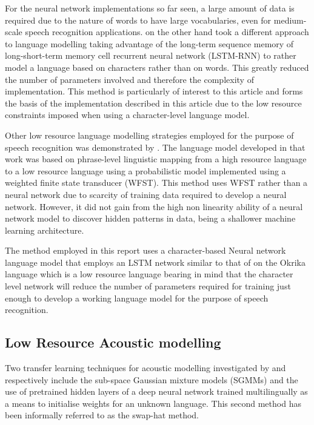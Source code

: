 For the neural network implementations so far seen, a large amount of data is required due to the nature of words to have large vocabularies, even for medium-scale speech recognition applications.   \cite{kim2016character} on the other hand took a different approach to language modelling taking advantage of the long-term sequence memory of long-short-term memory cell recurrent neural network (LSTM-RNN) to rather model a language based on characters rather than on words.  This greatly reduced the number of parameters involved and therefore the complexity of implementation.  This method is particularly of interest to this article and forms the basis of the implementation described in this article due to the low resource constraints imposed when using a character-level language model.

Other low resource language modelling strategies employed for the purpose of speech recognition was demonstrated by \cite{xu2013cross}.  The language model developed in that work was based on phrase-level linguistic mapping from a high resource language to a low resource language using a probabilistic model implemented using a weighted finite state transducer (WFST). This method uses WFST rather than a neural network due to scarcity of training data required to develop a neural network. However, it did not gain from the high non linearity ability of a neural network model to discover hidden patterns in data, being a shallower machine learning architecture.

The method employed in this report uses a character-based Neural network language model that employs an LSTM network similar to that of \cite{kim2016character} on the Okrika language which is a low resource language bearing in mind that the character level network will reduce the number of parameters required for training just enough to develop a working language model for the purpose of speech recognition.  

\subsection{Low Resource Acoustic modelling}

Two transfer learning techniques for acoustic modelling investigated by \cite{povey2011subspace} and \cite{ghoshal2013multilingual} respectively include the sub-space Gaussian mixture models (SGMMs) and the use of pretrained hidden layers of a deep neural network trained multilingually as a means to initialise weights for an unknown language.  This second method has been informally referred to as the swap-hat method.


